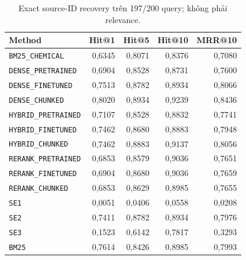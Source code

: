 \begin{table}[H]\centering\small\setlength{\tabcolsep}{4pt}\renewcommand{\arraystretch}{1.16}
\caption{Exact source-ID recovery trên 197/200 query; không phải relevance.}\label{tab:synthetic}
\begin{tabular}{p{.37\linewidth}rrrr}
\toprule Method & Hit@1 & Hit@5 & Hit@10 & MRR@10 \\
\midrule
{\footnotesize\texttt{BM25\_CHEMICAL}} & 0,6345 & 0,8071 & 0,8376 & 0,7080 \\
{\footnotesize\texttt{DENSE\_PRETRAINED}} & 0,6904 & 0,8528 & 0,8731 & 0,7600 \\
{\footnotesize\texttt{DENSE\_FINETUNED}} & 0,7513 & 0,8782 & 0,8934 & 0,8066 \\
{\footnotesize\texttt{DENSE\_CHUNKED}} & 0,8020 & 0,8934 & 0,9239 & 0,8436 \\
{\footnotesize\texttt{HYBRID\_PRETRAINED}} & 0,7107 & 0,8528 & 0,8832 & 0,7741 \\
{\footnotesize\texttt{HYBRID\_FINETUNED}} & 0,7462 & 0,8680 & 0,8883 & 0,7948 \\
{\footnotesize\texttt{HYBRID\_CHUNKED}} & 0,7462 & 0,8883 & 0,9137 & 0,8056 \\
{\footnotesize\texttt{RERANK\_PRETRAINED}} & 0,6853 & 0,8579 & 0,9036 & 0,7651 \\
{\footnotesize\texttt{RERANK\_FINETUNED}} & 0,6904 & 0,8680 & 0,9036 & 0,7659 \\
{\footnotesize\texttt{RERANK\_CHUNKED}} & 0,6853 & 0,8629 & 0,8985 & 0,7655 \\
{\footnotesize\texttt{SE1}} & 0,0051 & 0,0406 & 0,0558 & 0,0208 \\
{\footnotesize\texttt{SE2}} & 0,7411 & 0,8782 & 0,8934 & 0,7976 \\
{\footnotesize\texttt{SE3}} & 0,1523 & 0,6142 & 0,7817 & 0,3293 \\
{\footnotesize\texttt{BM25}} & 0,7614 & 0,8426 & 0,8985 & 0,7993 \\
\bottomrule\end{tabular}
\end{table}
